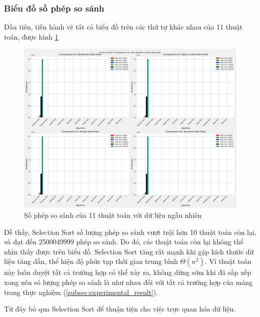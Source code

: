 \subsubsection{Biểu đồ số phép so sánh}

Đầu tiên, tiến hành vẽ tất cả biểu đồ trên các thứ tự khác nhau của 11 thuật toán, được hình \ref{fig:all_the_number_of_comparisons_for_each_algorithm_of_each_data_order}

\begin{figure}[H]
    \centering
    \includegraphics[width=\textwidth]{experimental_result/images/all_the_number_of_comparisons_for_each_algorithm_of_each_data_order.png}
    \caption{Số phép so sánh của 11 thuật toán với dữ liệu ngẫu nhiên}
    \label{fig:all_the_number_of_comparisons_for_each_algorithm_of_each_data_order}
\end{figure}

Dễ thấy, Selection Sort số lượng phép so sánh vượt trội hơn 10 thuật toán còn lại, và đạt đến 2500049999 phép so sánh. Do đó, các thuật toán còn lại không thể nhìn thấy được trên biểu đồ. Selection Sort tăng rất mạnh khi gặp kích thước dữ liệu tăng dần, thể hiện độ phức tạp thời gian trung bình $\Theta(n^2)$. Vì thuật toán này luôn duyệt tất cả trường hợp có thể xảy ra, không dừng sớm khi đã sắp xếp xong nên só lượng phép so sánh là như nhau đối với tất cả trường hợp của mảng trong thực nghiệm (\ref{subsec:experimental_result}).  

Từ đây bỏ qua Selection Sort để thuận tiện cho việc trực quan hóa dữ liệu.


